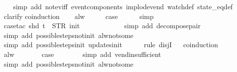 \begin{isabellebody}
%
\isadelimproof
\ \ %
\endisadelimproof
%
\isatagproof
{}\isamarkupfalse%
\ {\isacharparenleft}simp\ add{\isacharcolon}\ not{\isacharunderscore}ev{\isacharunderscore}iff\ event{\isacharunderscore}components\ implode{\isacharunderscore}vend\ watch{\isacharunderscore}def\ state_eq{\isacharunderscore}def{\isacharparenright}\isanewline
\ \ \isamarkupfalse%
\ clarify\isanewline
{}\isamarkupfalse%
{\isacharparenleft}coinduction{\isacharparenright}\isanewline
\ \ \isamarkupfalse%
\ alw\isanewline
\ \ \isamarkupfalse%
\ \isamarkupfalse%
\ {\isacharquery}case\isanewline
\ \ \ \ \isamarkupfalse%
\ simp\isanewline
\ \ \ \ \isamarkupfalse%
\ {\isacharparenleft}case{\isacharunderscore}tac\ {\isachardoublequoteopen}shd\ t\ {\isacharequal}\ {\isacharparenleft}STR\ {\isacharprime}{\isacharprime}init{\isacharprime}{\isacharprime}{\isacharcomma}\ {\isacharbrackleft}{\isacharbrackright}{\isacharparenright}{\isachardoublequoteclose}{\isacharparenright}\isanewline
\ \ \ \ \ \isamarkupfalse%
\isanewline
\ \ \ \ \isamarkupfalse%
\ {\isacharparenleft}simp\ add{\isacharcolon}\ decompose{\isacharunderscore}pair{\isacharparenright}\isanewline
\ \ \ \ \ \isamarkupfalse%
\ {\isacharparenleft}simp\ add{\isacharcolon}\ possible{\isacharunderscore}steps{\isacharunderscore}not{\isacharunderscore}init\ alw{\isacharunderscore}not{\isacharunderscore}some{\isacharparenright}\isanewline
\ \ \ \ \isamarkupfalse%
\ {\isacharparenleft}simp\ add{\isacharcolon}\ possible{\isacharunderscore}steps{\isacharunderscore}init\ updates{\isacharunderscore}init{\isacharparenright}\isanewline
\ \ \ \ \isamarkupfalse%
\ {\isacharparenleft}rule\ disjI{}{\isacharparenright}\isanewline
\ \ \isamarkupfalse%
{\isacharparenleft}coinduction{\isacharparenright}\isanewline
\ \ \ \ \isamarkupfalse%
\ alw\isanewline
\ \ \ \ \isamarkupfalse%
\ \isamarkupfalse%
\ {\isacharquery}case\isanewline
\ \ \ \ \ \ \isamarkupfalse%
\ {\isacharparenleft}simp\ add{\isacharcolon}\ vend{\isacharunderscore}insufficient{\isacharparenright}\isanewline
\ \ \ \ \ \isamarkupfalse%
\ {\isacharparenleft}simp\ add{\isacharcolon}\ possible{\isacharunderscore}steps{\isacharunderscore}not{\isacharunderscore}init\ alw{\isacharunderscore}not{\isacharunderscore}some{\isacharparenright}\isanewline
\ \ \isamarkupfalse%

\end{isabellebody}
